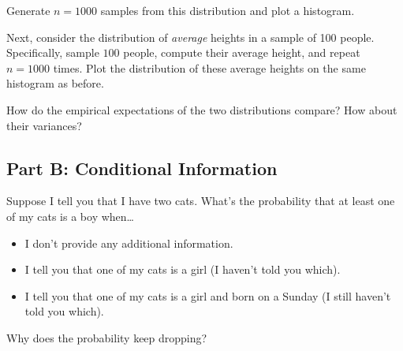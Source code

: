 \documentclass{article}
\begin{document}
Generate \(n=1000\) samples from this distribution and plot a histogram.

Next, consider the distribution of \emph{average} heights in a sample of 100 people. Specifically, sample \(100\) people, compute their average height, and repeat \(n=1000\) times. Plot the distribution of these average heights on the same histogram as before.

How do the empirical expectations of the two distributions compare? How about their variances?

\hypertarget{part-b-conditional-information}{%
\subsection*{Part B: Conditional Information}\label{part-b-conditional-information}}

Suppose I tell you that I have two cats. What's the probability that at least one of my cats is a boy when\ldots{}

\begin{itemize}
\item
  I don't provide any additional information.
\item
  I tell you that one of my cats is a girl (I haven't told you which).
\item
  I tell you that one of my cats is a girl and born on a Sunday (I still haven't told you which).
\end{itemize}

Why does the probability keep dropping?
\end{document}
